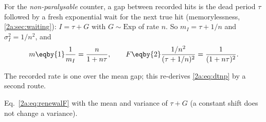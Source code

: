 For the \emph{non-paralysable} counter, a gap between recorded hits is the dead period $\tau$ followed by a fresh exponential wait for the next true hit (memorylessness, \cref{2a:sec:waiting}): $I=\tau+G$ with $G\sim\mathrm{Exp}$ of rate $n$. So $m_I=\tau+1/n$ and $\sigma_I^2=1/n^2$, and
\begin{align}
  m \eqby{1} \frac{1}{m_I} = \frac{n}{1+n\tau},\qquad
  F \eqby{2} \frac{1/n^2}{(\tau+1/n)^2} = \frac{1}{(1+n\tau)^2}. \label{2a:eq:dtnpF}
\end{align}
\begin{explain}
  \item The recorded rate is one over the mean gap; this re-derives \eqref{2a:eq:dtnp} by a second route.
  \item Eq.~\eqref{2a:eq:renewalF} with the mean and variance of $\tau+G$ (a constant shift does not change a variance).
\end{explain}

